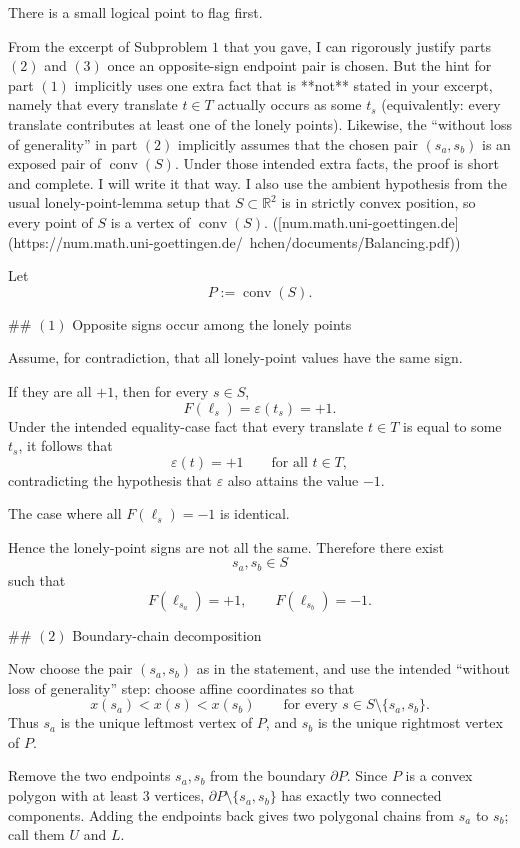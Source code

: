 There is a small logical point to flag first.

From the excerpt of Subproblem \(1\) that you gave, I can rigorously justify parts \( (2)\) and \( (3)\) once an opposite-sign endpoint pair is chosen. But the hint for part \( (1)\) implicitly uses one extra fact that is **not** stated in your excerpt, namely that every translate \(t\in T\) actually occurs as some \(t_s\) (equivalently: every translate contributes at least one of the lonely points). Likewise, the “without loss of generality” in part \( (2)\) implicitly assumes that the chosen pair \((s_a,s_b)\) is an exposed pair of \(\operatorname{conv}(S)\). Under those intended extra facts, the proof is short and complete. I will write it that way. I also use the ambient hypothesis from the usual lonely-point-lemma setup that \(S\subset\mathbb{R}^2\) is in strictly convex position, so every point of \(S\) is a vertex of \(\operatorname{conv}(S)\). ([num.math.uni-goettingen.de](https://num.math.uni-goettingen.de/~hchen/documents/Balancing.pdf))

Let
\[
P:=\operatorname{conv}(S).
\]

## \( (1)\) Opposite signs occur among the lonely points

Assume, for contradiction, that all lonely-point values have the same sign.

If they are all \(+1\), then for every \(s\in S\),
\[
F(\ell_s)=\varepsilon(t_s)=+1.
\]
Under the intended equality-case fact that every translate \(t\in T\) is equal to some \(t_s\), it follows that
\[
\varepsilon(t)=+1\qquad\text{for all }t\in T,
\]
contradicting the hypothesis that \(\varepsilon\) also attains the value \(-1\).

The case where all \(F(\ell_s)=-1\) is identical.

Hence the lonely-point signs are not all the same. Therefore there exist
\[
s_a,s_b\in S
\]
such that
\[
F(\ell_{s_a})=+1,\qquad F(\ell_{s_b})=-1.
\]

## \( (2)\) Boundary-chain decomposition

Now choose the pair \((s_a,s_b)\) as in the statement, and use the intended “without loss of generality” step: choose affine coordinates so that
\[
x(s_a)<x(s)<x(s_b)\qquad\text{for every }s\in S\setminus\{s_a,s_b\}.
\]
Thus \(s_a\) is the unique leftmost vertex of \(P\), and \(s_b\) is the unique rightmost vertex of \(P\).

Remove the two endpoints \(s_a,s_b\) from the boundary \(\partial P\). Since \(P\) is a convex polygon with at least \(3\) vertices, \(\partial P\setminus\{s_a,s_b\}\) has exactly two connected components. Adding the endpoints back gives two polygonal chains from \(s_a\) to \(s_b\); call them \(U\) and \(L\).

